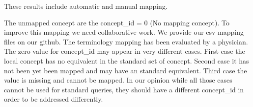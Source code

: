 \begin{table*}[t]
\end{table*}

These results include automatic and manual mapping.

The unmapped concept are the concept\_id = 0 (No mapping concept). To improve
this mapping we need collaborative work. We provide our csv mapping files on
our github.
The terminology mapping has been evaluated by a physician. 
The zero value for concept\_id may appear in very different cases. First case
the local concept has no equivalent in the standard set of concept. Second case
it has not been yet been mapped and may have an standard equivalent. Third case
the value is missing and cannot be mapped. In our opinion while all those cases
cannot be used for standard queries, they should have a different concept\_id
in order to be addressed differently.

